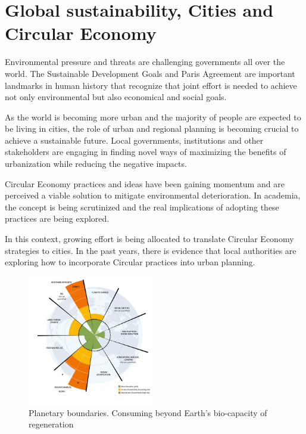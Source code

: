 
\chapter{Global sustainability, Cities and Circular Economy}
Environmental pressure and threats are challenging governments all over the world. The Sustainable Development Goals and Paris Agreement are important landmarks in human history that recognize that joint effort is needed to achieve not only environmental but also economical and social goals.\par
As the world is becoming more urban and the majority of people are expected to be living in cities, the role of urban and regional planning is becoming crucial to achieve a sustainable future. Local governments, institutions and other stakeholders are engaging in finding novel ways of maximizing the benefits of urbanization while reducing the negative impacts.\par
Circular Economy practices and ideas have been gaining momentum and are perceived a viable solution to mitigate environmental deterioration. In academia, the concept is being scrutinized and the real implications of adopting these practices are being explored.\par
In this context, growing effort is being allocated to translate Circular Economy strategies to cities. In the past years, there is evidence that local authorities are exploring how to incorporate Circular practices into urban planning. 

\begin{figure}[h!]
    \centering
    \includegraphics[width=0.5\textwidth]{sections/asset/boundy.PNG}
    \caption{Planetary boundaries. Consuming beyond Earth's bio-capacity of regeneration}
    \label{fig:badbad}
\end{figure}



